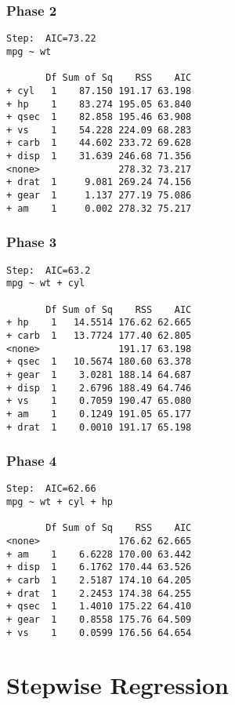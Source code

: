 \documentclass[a4paper,12pt]{article}
\begin{document}
\subsubsection{Phase 2}
\footnotesize
\begin{verbatim}
Step:  AIC=73.22
mpg ~ wt

       Df Sum of Sq    RSS    AIC
+ cyl   1    87.150 191.17 63.198
+ hp    1    83.274 195.05 63.840
+ qsec  1    82.858 195.46 63.908
+ vs    1    54.228 224.09 68.283
+ carb  1    44.602 233.72 69.628
+ disp  1    31.639 246.68 71.356
<none>              278.32 73.217
+ drat  1     9.081 269.24 74.156
+ gear  1     1.137 277.19 75.086
+ am    1     0.002 278.32 75.217
\end{verbatim}
\normalsize
\subsubsection{Phase 3}
\footnotesize
\begin{verbatim}
Step:  AIC=63.2
mpg ~ wt + cyl

       Df Sum of Sq    RSS    AIC
+ hp    1   14.5514 176.62 62.665
+ carb  1   13.7724 177.40 62.805
<none>              191.17 63.198
+ qsec  1   10.5674 180.60 63.378
+ gear  1    3.0281 188.14 64.687
+ disp  1    2.6796 188.49 64.746
+ vs    1    0.7059 190.47 65.080
+ am    1    0.1249 191.05 65.177
+ drat  1    0.0010 191.17 65.198
\end{verbatim}
\normalsize
\subsubsection{Phase 4}
\footnotesize
\begin{verbatim}
Step:  AIC=62.66
mpg ~ wt + cyl + hp

       Df Sum of Sq    RSS    AIC
<none>              176.62 62.665
+ am    1    6.6228 170.00 63.442
+ disp  1    6.1762 170.44 63.526
+ carb  1    2.5187 174.10 64.205
+ drat  1    2.2453 174.38 64.255
+ qsec  1    1.4010 175.22 64.410
+ gear  1    0.8558 175.76 64.509
+ vs    1    0.0599 176.56 64.654
\end{verbatim}
\normalsize
\newpage
\section{Stepwise Regression}

\end{document}
